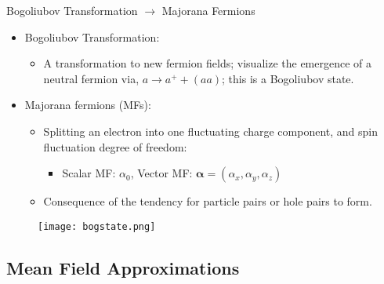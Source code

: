 \documentclass{beamer}
\begin{document}
\begin{frame}{Bogoliubov Transformation $\to$ Majorana Fermions}
    
    \begin{itemize}
        \item Bogoliubov Transformation: 
        \begin{itemize}
            \item A transformation to new fermion fields; visualize the emergence of a neutral fermion via, $a \to a^+ + (aa)$; this is a Bogoliubov state.

        \end{itemize}
        
        \item Majorana fermions (MFs):
        \begin{itemize}
            \item Splitting an electron into one fluctuating charge component, and spin fluctuation degree of freedom:
            \begin{itemize}
                \item Scalar MF: $\alpha_0$, Vector MF: $\boldsymbol\alpha = (\alpha_x, \alpha_y, \alpha_z)$
            \end{itemize}
            
            \item Consequence of the tendency for particle pairs or hole pairs to form.
        \end{itemize}


        
    \end{itemize}

    \begin{figure}
    \centering
    \texttt{[image: bogstate.png]}
    \label{fig:elecmuon}
    \end{figure}

\end{frame}




\subsection{Mean Field Approximations}
\end{document}
